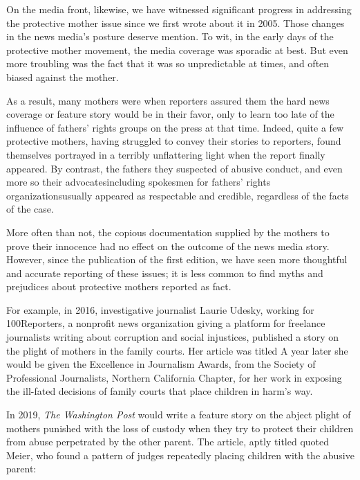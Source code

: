 \vspace{3em}

\noindent{}On the media front, likewise, we have witnessed significant progress in
addressing the protective mother issue since we first wrote about it in
2005. Those changes in the news media's posture deserve mention. To
wit, in the early days of the protective mother movement, the media
coverage was sporadic at best. But even more troubling was the fact that
it was so unpredictable at times, and often biased against the mother. \pfl{}

As a result, many mothers were  when reporters assured them
the hard news coverage or feature story would be in their favor, only
to learn too late of the influence of fathers' rights groups on the press at
that time. Indeed, quite a few protective mothers, having struggled to
convey their stories to reporters, found themselves portrayed in a 
terribly unflattering light when the report finally appeared. 
By contrast, the
fathers they suspected of abusive conduct, and even more so their 
advocates\mdash{}including spokesmen for fathers' rights organizations\mdash{}usually
appeared as respectable and credible, regardless of the facts of the case. \pfl{}


More often than not, the copious documentation supplied by the
mothers to prove their innocence had no effect on the outcome of the
news media story. However, since the publication of the first edition,
we have seen more thoughtful and accurate reporting of these issues; it
is less common to find myths and prejudices about protective mothers
reported as fact. \pfl{}


For example, in 2016, investigative journalist Laurie Udesky, working for 100Reporters, a nonprofit news organization giving a platform
for freelance journalists writing about corruption and social injustices,
published a story on the plight of mothers in the family courts. 
Her article was titled \hspace{1pt} A year later she would be given
the Excellence in Journalism Awards, from the Society of Professional
Journalists, Northern California Chapter, for her work in exposing the
ill-fated decisions of family courts that place children in harm's way. \pfl{}

In 2019, \textit{The Washington Post} would write a feature story on the abject plight of mothers punished with the loss of custody when they
try to protect their children from abuse perpetrated by the other parent. 
The article, aptly 
titled  quoted Meier,
who found a pattern of judges repeatedly placing children with the
abusive parent: \hspace{1pt} \pfl{}



